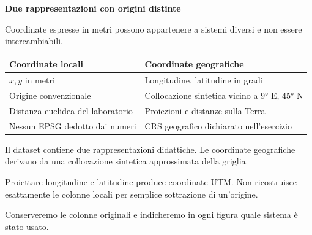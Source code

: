 \documentclass[12pt,aspectratio=1610]{beamer}
\newcommand{\PBody}[1]{\par{\fontsize{11.3}{14.8}\selectfont #1\par}}
\newcommand{\PSmall}[1]{\par{\fontsize{9.8}{13.1}\selectfont #1\par}}
\newcommand{\PInfo}[1]{%
\begin{tcolorbox}[enhanced,arc=1.6mm,boxrule=.55pt,colback=GeoTint,
 colframe=Rule!80!Classical,left=2.3mm,right=2.3mm,top=2mm,bottom=2mm,
 before skip=1mm,after skip=1mm]
\PSmall{#1}\end{tcolorbox}}
\begin{document}
\begin{frame}[plain]\hypertarget{slide15}{}
\begin{lrbox}{\TitleBox}
\begin{minipage}[t]{17.7cm}\raggedright\color{Ink}\fontsize{11.3}{14.8}\selectfont
\color{Navy}\bfseries\fontsize{20.6}{24.5}\selectfont Due rappresentazioni con origini distinte
\end{minipage}\end{lrbox}

\begin{lrbox}{\RecallBox}
\begin{minipage}[t]{14.3cm}\raggedright\color{Ink}\fontsize{11.3}{14.8}\selectfont
\fontsize{10.3}{13.8}\selectfont Coordinate espresse in metri possono appartenere a sistemi diversi e non essere intercambiabili.
\end{minipage}\end{lrbox}

\begin{lrbox}{\PilotLeftBox}
\begin{minipage}[t]{10.05cm}\raggedright\color{Ink}\fontsize{11.3}{14.8}\selectfont
{\fontsize{10.2}{13.1}\selectfont\renewcommand{\arraystretch}{1.45}\begin{tabular}{@{}p{4.5cm}p{4.5cm}@{}}\toprule
\textbf{Coordinate locali} & \textbf{Coordinate geografiche}\\\midrule
$x,y$ in metri & Longitudine, latitudine in gradi\\
Origine convenzionale & Collocazione sintetica vicino a 9° E, 45° N\\
Distanza euclidea del laboratorio & Proiezioni e distanze sulla Terra\\
Nessun EPSG dedotto dai numeri & CRS geografico dichiarato nell’esercizio\\
\bottomrule\end{tabular}}

\end{minipage}\end{lrbox}

\begin{lrbox}{\PilotRightBox}
\begin{minipage}[t]{7.55cm}\raggedright\color{Ink}\fontsize{11.3}{14.8}\selectfont
\PBody{Il dataset contiene due rappresentazioni didattiche. Le coordinate geografiche derivano da una collocazione sintetica approssimata della griglia.}
\vspace{2.5mm}
\PInfo{Proiettare longitudine e latitudine produce coordinate UTM. Non ricostruisce esattamente le colonne locali per semplice sottrazione di un’origine.}
\PBody{Conserveremo le colonne originali e indicheremo in ogni figura quale sistema è stato usato.}
\vspace{2.5mm}


\end{minipage}
\end{lrbox}
\end{frame}
\end{document}
